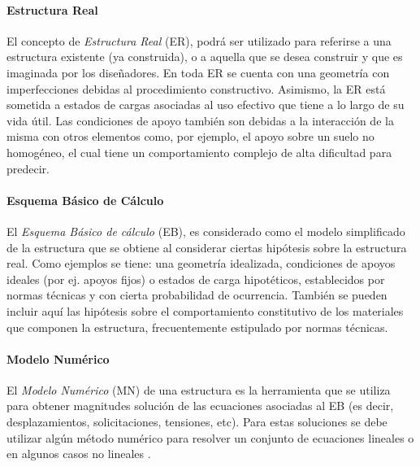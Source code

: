 \paragraph{Estructura Real}
%
El concepto de \textit{Estructura Real} (ER), podrá ser utilizado para referirse a una estructura existente (ya construida), o a aquella que se desea construir y que es imaginada por los diseñadores. %
%
En toda ER se cuenta con una geometría con imperfecciones debidas al procedimiento constructivo. %
Asimismo, la ER está sometida a estados de cargas asociadas al uso efectivo que tiene a lo largo de su vida útil. %
%
Las condiciones de apoyo también son debidas a la interacción de la misma con otros elementos como, por ejemplo, el apoyo sobre un suelo no homogéneo, el cual tiene un comportamiento complejo de alta dificultad para predecir.


\paragraph{Esquema Básico de Cálculo}
%
El \textit{Esquema Básico de cálculo} (EB), es considerado como el modelo simplificado de la estructura que se obtiene al considerar ciertas hipótesis sobre la estructura real. %
%
Como ejemplos se tiene: una geometría idealizada, condiciones de apoyos ideales (por ej. apoyos fijos) o estados de carga hipotéticos, establecidos por normas técnicas y con cierta probabilidad de ocurrencia. %
%
También se pueden incluir aquí las hipótesis sobre el comportamiento constitutivo de los materiales que componen la estructura, frecuentemente estipulado por normas técnicas.

\paragraph{Modelo Numérico}
%
El \textit{Modelo Numérico} (MN) de una estructura es la herramienta que se utiliza para obtener magnitudes solución de las ecuaciones asociadas al EB (es decir, desplazamientos, solicitaciones, tensiones, etc). %
%
Para estas soluciones se debe utilizar algún método numérico para resolver un conjunto de ecuaciones lineales o en algunos casos no lineales \citep{Bazzano2017}. %
%


